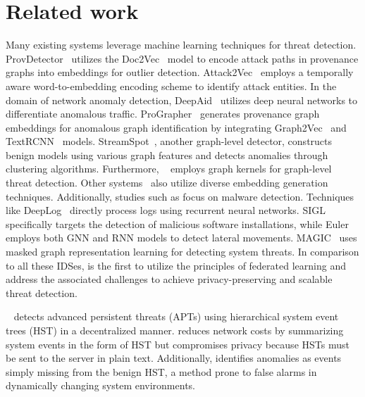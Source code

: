 \section{Related work}
\label{s:relwk}



 Many existing systems leverage machine learning techniques for threat detection. ProvDetector~\cite{provdetector2020} utilizes the Doc2Vec~\cite{le2014distributed} model to encode attack paths in provenance graphs into embeddings for outlier detection. Attack2Vec~\cite{shen2019attack2vec} employs a temporally aware word-to-embedding encoding scheme to identify attack entities. In the domain of network anomaly detection, DeepAid~\cite{deepaid} utilizes deep neural networks to differentiate anomalous traffic. ProGrapher~\cite{yangprographer} generates provenance graph embeddings for anomalous graph identification by integrating Graph2Vec~\cite{narayanan2017graph2vec} and TextRCNN~\cite{lai2015recurrent} models. StreamSpot~\cite{streamspot}, another graph-level detector, constructs benign models using various graph features and detects anomalies through clustering algorithms. Furthermore, \unicorn~\cite{han2020unicorn} employs graph kernels for graph-level threat detection. Other systems~\cite{aljawarneh2018anomaly, maseer2021benchmarking, gyanchandani2012taxonomy,atlas} also utilize diverse embedding generation techniques. Additionally, studies such as \cite{zolkipli2011approach, chakkaravarthy2019survey, isohara2011kernel} focus on malware detection. Techniques like DeepLog~\cite{deeplog2017} directly process logs using recurrent neural networks. SIGL~\cite{sigl} specifically targets the detection of malicious software installations, while Euler~\cite{king2022euler} employs both GNN and RNN models to detect lateral movements. MAGIC~\cite{jia2023magic} uses masked graph representation learning for detecting system threats. In comparison to all these IDSes, \Sys is the first to utilize the principles of federated learning and address the associated challenges to achieve privacy-preserving and scalable threat detection.


 \disdet~\cite{dong2023distdet} detects advanced persistent threats (APTs) using hierarchical system event trees (HST) in a decentralized manner. \disdet reduces network costs by summarizing system events in the form of HST but compromises privacy because HSTs must be sent to the server in plain text. Additionally, \disdet identifies anomalies as events simply missing from the benign HST, a method prone to false alarms in dynamically changing system environments.

